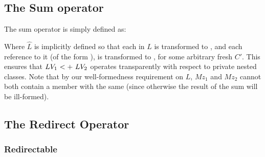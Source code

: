 \subsection{The Sum operator}
The sum operator is simply defined as:

\begin{defs}
{}
{}
\end{defs}
Where $\widehat{L}$ is implicitly defined so that each  in $L$ is transformed to , and each reference to it (of the form ), is transformed to , for some arbitrary fresh $C'$. This ensures that $\summ{LV_1}{LV_2}$ operates transparently with respect to private nested classes. Note that by our well-formedness requirement on $L$, $Mz_1$ and $Mz_2$ cannot both contain a member with the same \Id (since otherwise the result of the sum will be ill-formed).

\subsection{The Redirect Operator}



\subsubsection{Redirectable}
\noindent\\ 


